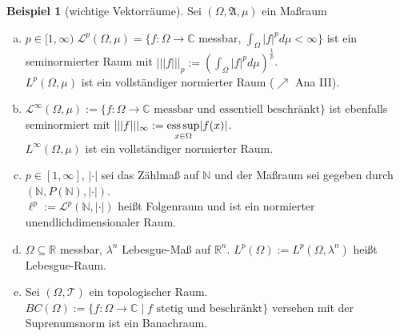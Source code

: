 \documentclass[ngerman]{report}
\theoremstyle{definition}%
\newtheorem{bsp}[section]{Beispiel}
\theoremstyle{myStyle}
\theoremstyle{plain}%
\newcommand{\C}{\mathbb{C}}
\newcommand{\R}{\mathbb{R}}
\newcommand{\N}{\mathbb{N}}
\newcommand{\hA}{\mathfrak{A}}%
\newcommand{\hL}{\mathcal{L}}
\newcommand{\tT}{\mathcal{T}} %
\newcommand{\ess}{\textnormal{ess}}
\newcommand{\seminorm}[1]{||| #1 |||}
\begin{document}
\begin{bsp}[wichtige Vektorräume]
	Sei $(\Omega,\hA,\mu)$ ein Maßraum
		\begin{enumerate}[(a)]
			\item $p\in[1,\infty)\; \hL^p(\Omega,\mu) = \{f:\Omega \rightarrow \C$ messbar, 
						$\int_\Omega |f|^p d\mu < \infty \}$ ist ein seminormierter Raum mit 
						$\seminorm{f}_p := (\int_\Omega |f|^p d\mu )^{\frac{1}{p}}$.\\
						$L^p(\Omega,\mu)$ ist ein vollständiger normierter Raum ($\nearrow$ Ana III).

			\item $\hL^\infty(\Omega,\mu) := \{f:\Omega \rightarrow \C 
						\text{ messbar und essentiell beschränkt} \}$ ist ebenfalls seminormiert mit 
						$\seminorm{f}_\infty := \underset{x\in\Omega}{\ess \sup} |f(x)|$.\\
						$L^\infty(\Omega,\mu)$ ist ein vollständiger normierter Raum.

			\item $p\in [1,\infty],\, |\cdot|$ sei das Zählmaß auf $\N$ und der Maßraum sei gegeben durch 
						$(\N, P(\N), |\cdot|)$.\\
						$\ell^p := \hL^p(\N, |\cdot|)$ heißt Folgenraum und ist ein normierter unendlichdimensionaler Raum.

			\item $\Omega \subseteq \R$ messbar, $\lambda^n$ Lebesgue-Maß auf $\R^n$.
						$L^p(\Omega) := L^p(\Omega,\lambda^n)$ heißt Lebesgue-Raum.

			\item Sei $(\Omega, \tT)$ ein topologischer Raum. 
						$BC(\Omega) := \{ f: \Omega \rightarrow \C\;|\;f 
						\text{ stetig und beschränkt} \}$ versehen mit der Suprenumsnorm ist ein Banachraum.
	\end{enumerate}

\end{bsp}
\end{document}
